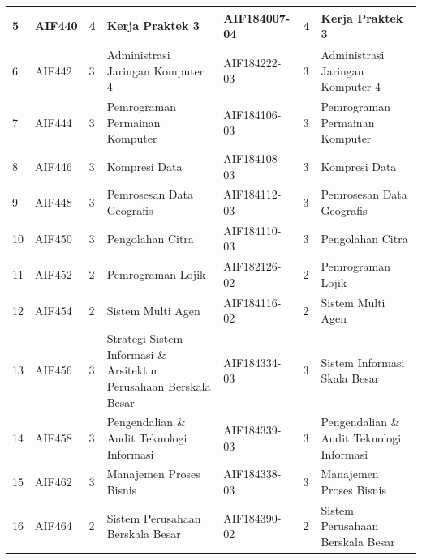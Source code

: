 \begin{table}[H]
\begin{tabular}{|p{0.35cm}|p{2cm}|p{0.55cm}|p{3.45cm}|p{2.65cm}|p{0.55cm}|p{3.45cm}|}
5 & AIF440 & 4 & Kerja Praktek 3 & AIF184007-04 & 4 & Kerja Praktek 3 \\ \hline
6 & AIF442 & 3 & Administrasi Jaringan Komputer 4 & AIF184222-03 & 3 & Administrasi Jaringan Komputer 4 \\ \hline
7 & AIF444 & 3 & Pemrograman Permainan Komputer & AIF184106-03 & 3 & Pemrograman Permainan Komputer \\ \hline
8 & AIF446 & 3 & Kompresi Data & AIF184108-03 & 3 & Kompresi Data \\ \hline
9 & AIF448 & 3 & Pemrosesan Data Geografis & AIF184112-03 & 3 & Pemrosesan Data Geografis \\ \hline
10 & AIF450 & 3 & Pengolahan Citra & AIF184110-03 & 3 & Pengolahan Citra \\ \hline
11 & AIF452 & 2 & Pemrograman Lojik & AIF182126-02 & 2 & Pemrograman Lojik \\ \hline
12 & AIF454 & 2 & Sistem Multi Agen & AIF184116-02 & 2 & Sistem Multi Agen \\ \hline
13 & AIF456 & 3 & Strategi Sistem Informasi \& Arsitektur Perusahaan Berskala Besar & AIF184334-03 & 3 & Sistem Informasi Skala Besar \\ \hline
14 & AIF458 & 3 & Pengendalian \& Audit Teknologi Informasi & AIF184339-03 & 3 & Pengendalian \& Audit Teknologi Informasi \\ \hline
15 & AIF462 & 3 & Manajemen Proses Bisnis & AIF184338-03 & 3 & Manajemen Proses Bisnis \\ \hline
16 & AIF464 & 2 & Sistem Perusahaan Berskala Besar & AIF184390-02 & 2 & Sistem Perusahaan Berskala Besar \\ \hline
\end{tabular}
\end{table}

